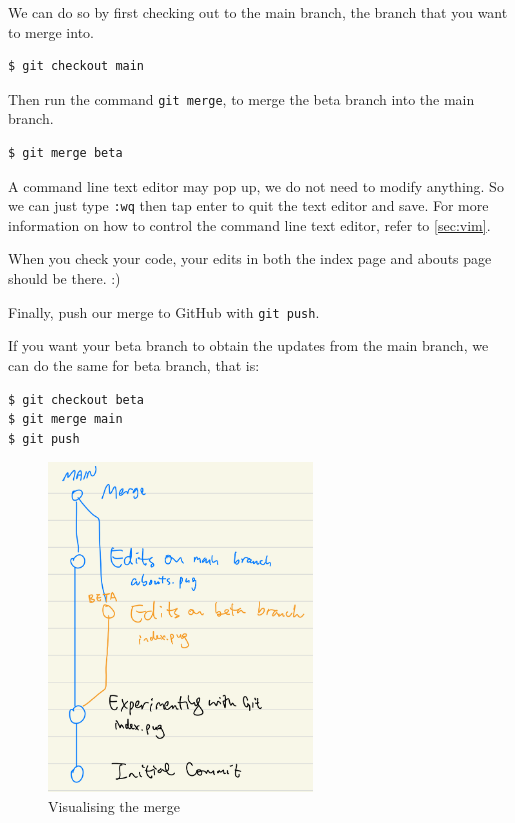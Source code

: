 We can do so by first checking out to the main branch, the branch that you want to merge into.

\begin{lstlisting}[language=bash]
$ git checkout main
\end{lstlisting}

Then run the command \texttt{git merge}, to merge the beta branch into the main branch.

\begin{lstlisting}[language=bash]
$ git merge beta
\end{lstlisting}

A command line text editor may pop up, we do not need to modify anything. So we can just type \texttt{:wq} then tap enter to quit the text editor and save. For more information on how to control the command line text editor, refer to \cref{sec:vim}.

When you check your code, your edits in both the index page and abouts page should be there. :)

Finally, push our merge to GitHub with \texttt{git push}.
\vspace{6mm}

If you want your beta branch to obtain the updates from the main branch, we can do the same for beta branch, that is:

\begin{lstlisting}[language=bash]
$ git checkout beta
$ git merge main
$ git push
\end{lstlisting}

\begin{figure}[h]
\centering
\includegraphics[width=7cm]{images/ch8-merge-safe.png}
\caption{Visualising the merge}
\end{figure}

